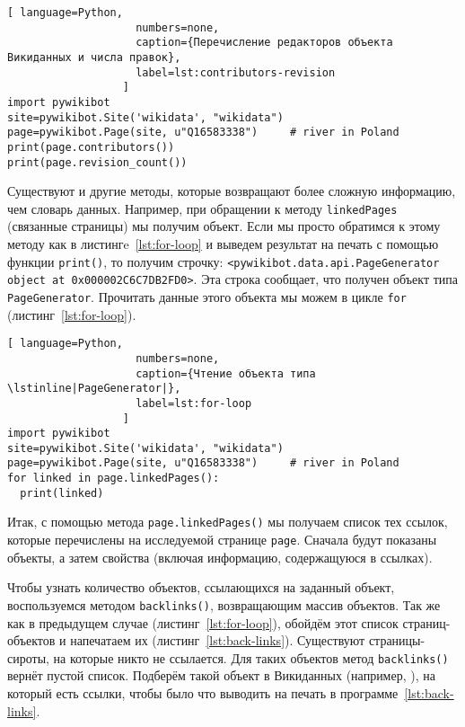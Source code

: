 \begin{lstlisting}[ language=Python,
                    numbers=none,
                    caption={Перечисление редакторов объекта Викиданных и числа правок},
                    label=lst:contributors-revision
                  ]
import pywikibot
site=pywikibot.Site('wikidata', "wikidata")
page=pywikibot.Page(site, u"Q16583338")     # river in Poland
print(page.contributors())
print(page.revision_count())
\end{lstlisting}

Существуют и другие методы, которые возвращают более сложную информацию, 
чем словарь данных. Например, при обращении к методу \lstinline|linkedPages| (связанные страницы) 
мы получим объект. 
Если мы просто обратимся к этому методу как в листингe~\ref{lst:for-loop} 
и выведем результат на печать с помощью функции \lstinline|print()|, то получим строчку: 
\lstinline|<pywikibot.data.api.PageGenerator object at 0x000002C6C7DB2FD0>|. 
Эта строка сообщает, что получен объект типа \lstinline|PageGenerator|. 
Прочитать данные этого объекта мы можем в цикле \lstinline|for| (листинг~\ref{lst:for-loop}).

\begin{lstlisting}[ language=Python,
                    numbers=none,
                    caption={Чтение объекта типа \lstinline|PageGenerator|},
                    label=lst:for-loop
                  ]
import pywikibot
site=pywikibot.Site('wikidata', "wikidata")
page=pywikibot.Page(site, u"Q16583338")     # river in Poland
for linked in page.linkedPages():
  print(linked)
\end{lstlisting}

Итак, с помощью метода \lstinline|page.linkedPages()| мы получаем список тех ссылок, 
которые перечислены на исследуемой странице \lstinline|page|. 
Сначала будут показаны объекты, а затем свойства (включая информацию, содержащуюся в ссылках).

Чтобы узнать количество объектов, ссылающихся на заданный объект, 
воспользуемся методом \lstinline|backlinks()|, возвращающим массив объектов. 
Так же как в предыдущем случае (листинг~\ref{lst:for-loop}), 
обойдём этот список страниц-объектов 
и напечатаем их (листинг~\ref{lst:back-links}). 
Существуют страницы-сироты, 
на которые никто не ссылается. 
Для таких объектов метод \lstinline|backlinks()| вернёт пустой список. 
Подберём такой объект в Викиданных (например, ), 
на который есть ссылки, чтобы было что выводить на печать в программе~\ref{lst:back-links}.


